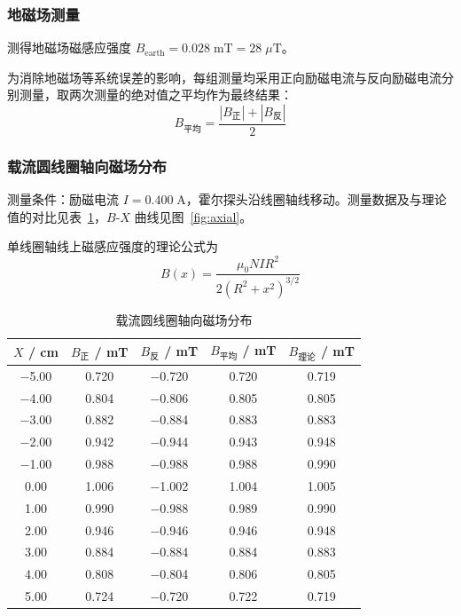 \documentclass{Phyport}
\begin{document}
\subsubsection{地磁场测量}

测得地磁场磁感应强度 $B_{\text{earth}} = 0.028\;\text{mT} = 28\;\mu\text{T}$。

为消除地磁场等系统误差的影响，每组测量均采用正向励磁电流与反向励磁电流分别测量，取两次测量的绝对值之平均作为最终结果：
\begin{equation*}
    B_{\text{平均}} = \frac{|B_{\text{正}}| + |B_{\text{反}}|}{2}
\end{equation*}

\subsubsection{载流圆线圈轴向磁场分布}

测量条件：励磁电流 $I = 0.400\;\text{A}$，霍尔探头沿线圈轴线移动。测量数据及与理论值的对比见表~\ref{tab:axial}，$B$-$X$ 曲线见图~\ref{fig:axial}。

单线圈轴线上磁感应强度的理论公式为
\begin{equation}
    B(x) = \frac{\mu_0 N I R^2}{2(R^2 + x^2)^{3/2}}
    \label{eq:single}
\end{equation}

\begin{table}[H]
    \centering
    \caption{载流圆线圈轴向磁场分布}
    \label{tab:axial}
    \begin{tabular}{ccccc}
        \toprule
        $X$ / cm & $B_{\text{正}}$ / mT & $B_{\text{反}}$ / mT & $B_{\text{平均}}$ / mT & $B_{\text{理论}}$ / mT \\
        \midrule
        $-$5.00 & 0.720 & $-$0.720 & 0.720 & 0.719 \\
        $-$4.00 & 0.804 & $-$0.806 & 0.805 & 0.805 \\
        $-$3.00 & 0.882 & $-$0.884 & 0.883 & 0.883 \\
        $-$2.00 & 0.942 & $-$0.944 & 0.943 & 0.948 \\
        $-$1.00 & 0.988 & $-$0.988 & 0.988 & 0.990 \\
         0.00   & 1.006 & $-$1.002 & 1.004 & 1.005 \\
         1.00   & 0.990 & $-$0.988 & 0.989 & 0.990 \\
         2.00   & 0.946 & $-$0.946 & 0.946 & 0.948 \\
         3.00   & 0.884 & $-$0.884 & 0.884 & 0.883 \\
         4.00   & 0.808 & $-$0.804 & 0.806 & 0.805 \\
         5.00   & 0.724 & $-$0.720 & 0.722 & 0.719 \\
        \bottomrule
    \end{tabular}
\end{table}
\end{document}

